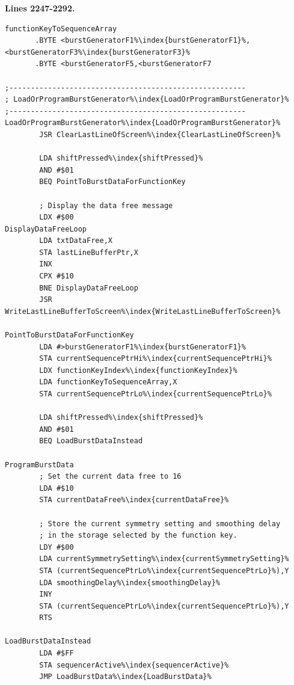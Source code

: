 \clearpage
\textbf{Lines 2247-2292. }
\begin{lstlisting}[basicstyle=\ttfamily\scriptsize,escapechar=\%]
functionKeyToSequenceArray
       .BYTE <burstGeneratorF1%\index{burstGeneratorF1}%,<burstGeneratorF3%\index{burstGeneratorF3}%
       .BYTE <burstGeneratorF5,<burstGeneratorF7

;-------------------------------------------------------
; LoadOrProgramBurstGenerator%\index{LoadOrProgramBurstGenerator}%
;-------------------------------------------------------
LoadOrProgramBurstGenerator%\index{LoadOrProgramBurstGenerator}%   
        JSR ClearLastLineOfScreen%\index{ClearLastLineOfScreen}%

        LDA shiftPressed%\index{shiftPressed}%
        AND #$01
        BEQ PointToBurstDataForFunctionKey

        ; Display the data free message
        LDX #$00
DisplayDataFreeLoop   
        LDA txtDataFree,X
        STA lastLineBufferPtr,X
        INX 
        CPX #$10
        BNE DisplayDataFreeLoop
        JSR WriteLastLineBufferToScreen%\index{WriteLastLineBufferToScreen}%

PointToBurstDataForFunctionKey   
        LDA #>burstGeneratorF1%\index{burstGeneratorF1}%
        STA currentSequencePtrHi%\index{currentSequencePtrHi}%
        LDX functionKeyIndex%\index{functionKeyIndex}%
        LDA functionKeyToSequenceArray,X
        STA currentSequencePtrLo%\index{currentSequencePtrLo}%

        LDA shiftPressed%\index{shiftPressed}%
        AND #$01
        BEQ LoadBurstDataInstead

ProgramBurstData
        ; Set the current data free to 16
        LDA #$10
        STA currentDataFree%\index{currentDataFree}%

        ; Store the current symmetry setting and smoothing delay
        ; in the storage selected by the function key. 
        LDY #$00
        LDA currentSymmetrySetting%\index{currentSymmetrySetting}%
        STA (currentSequencePtrLo%\index{currentSequencePtrLo}%),Y
        LDA smoothingDelay%\index{smoothingDelay}%
        INY 
        STA (currentSequencePtrLo%\index{currentSequencePtrLo}%),Y
        RTS 

LoadBurstDataInstead
        LDA #$FF
        STA sequencerActive%\index{sequencerActive}%
        JMP LoadBurstData%\index{LoadBurstData}%

\end{lstlisting}
\clearpage

